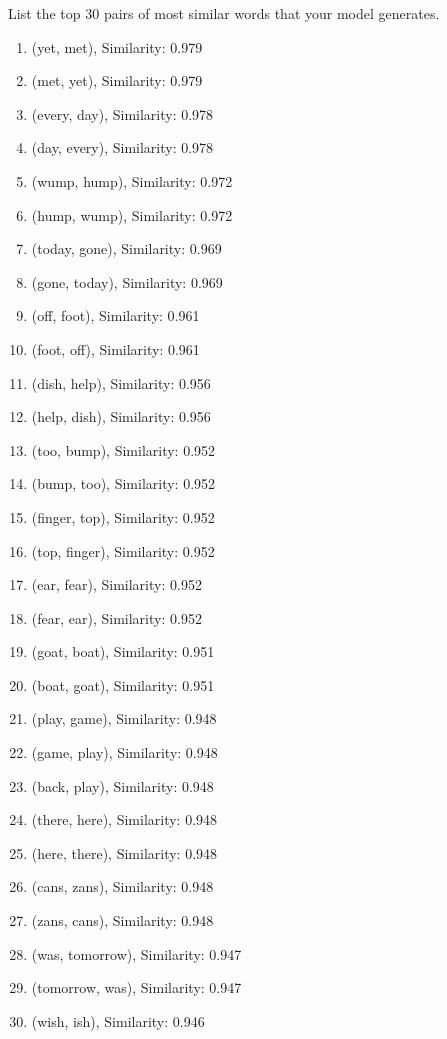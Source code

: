 \problem[1]
List the top 30 pairs of most similar words that your model generates.
\begin{solution}
\begin{enumerate}
\item (yet, met), Similarity: 0.979
\item (met, yet), Similarity: 0.979
\item (every, day), Similarity: 0.978
\item (day, every), Similarity: 0.978
\item (wump, hump), Similarity: 0.972
\item (hump, wump), Similarity: 0.972
\item (today, gone), Similarity: 0.969
\item (gone, today), Similarity: 0.969
\item (off, foot), Similarity: 0.961
\item (foot, off), Similarity: 0.961
\item (dish, help), Similarity: 0.956
\item (help, dish), Similarity: 0.956
\item (too, bump), Similarity: 0.952
\item (bump, too), Similarity: 0.952
\item (finger, top), Similarity: 0.952
\item (top, finger), Similarity: 0.952
\item (ear, fear), Similarity: 0.952
\item (fear, ear), Similarity: 0.952
\item (goat, boat), Similarity: 0.951
\item (boat, goat), Similarity: 0.951
\item (play, game), Similarity: 0.948
\item (game, play), Similarity: 0.948
\item (back, play), Similarity: 0.948
\item (there, here), Similarity: 0.948
\item (here, there), Similarity: 0.948
\item (cans, zans), Similarity: 0.948
\item (zans, cans), Similarity: 0.948
\item (was, tomorrow), Similarity: 0.947
\item (tomorrow, was), Similarity: 0.947
\item (wish, ish), Similarity: 0.946
\end{enumerate}
\end{solution}

